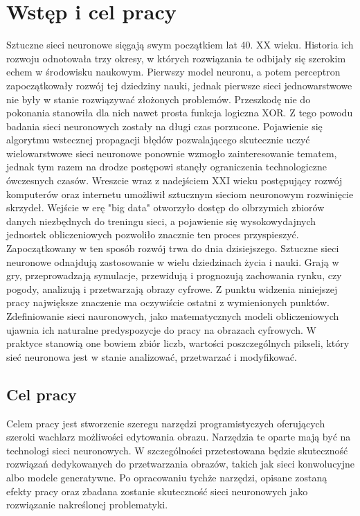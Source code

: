 \section{Wstęp i cel pracy}

  \tab Sztuczne sieci neuronowe sięgają swym początkiem lat 40. XX wieku.
  Historia ich rozwoju odnotowała trzy okresy, w których rozwiązania te
  odbijały się szerokim echem w środowisku naukowym.
  \newline
  \tab Pierwszy model neuronu, a potem perceptron zapoczątkowały
  rozwój tej dziedziny nauki, jednak pierwsze sieci jednowarstwowe nie były w
  stanie rozwiązywać złożonych problemów. Przeszkodę nie do pokonania stanowiła
  dla nich nawet prosta funkcja logiczna XOR. Z tego powodu badania sieci
  neuronowych zostały na długi czas porzucone.
  \newline
  \tab Pojawienie się algorytmu wstecznej propagacji błędów
  pozwalającego skutecznie uczyć wielowarstwowe sieci neuronowe ponownie
  wzmogło zainteresowanie tematem, jednak tym razem na drodze postępowi stanęły
  ograniczenia technologiczne ówczesnych czasów.
  \newline
  \tab Wreszcie wraz z nadejściem XXI wieku postępujący rozwój
  komputerów oraz internetu umożliwił sztucznym sieciom neuronowym rozwinięcie
  skrzydeł. Wejście w erę "big data" otworzyło dostęp do olbrzymich zbiorów
  danych niezbędnych do treningu sieci, a pojawienie się wysokowydajnych
  jednostek obliczeniowych pozwoliło znacznie ten proces przyspieszyć.
  \newline
  \tab Zapoczątkowany w ten sposób rozwój trwa do dnia dzisiejszego.
  Sztuczne sieci neuronowe odnajdują zastosowanie w wielu dziedzinach życia i
  nauki. Grają w gry, przeprowadzają symulacje, przewidują i prognozują
  zachowania rynku, czy pogody, analizują i przetwarzają obrazy cyfrowe.
  \newline 
  \tab Z punktu widzenia niniejszej pracy największe znaczenie ma
  oczywiście ostatni z wymienionych punktów. Zdefiniowanie sieci nauronowych,
  jako matematycznych modeli obliczeniowych ujawnia ich naturalne predyspozycje
  do pracy na obrazach cyfrowych. W praktyce stanowią one bowiem zbiór liczb,
  wartości poszczególnych pikseli, który sieć neuronowa jest w stanie
  analizować, przetwarzać i modyfikować.

  \subsection{Cel pracy}
    \tab Celem pracy jest stworzenie szeregu narzędzi programistyczych
    oferujących szeroki wachlarz możliwości edytowania obrazu. Narzędzia te
    oparte mają być na technologi sieci neuronowych. W szczególności
    przetestowana będzie skuteczność rozwiązań dedykowanych do przetwarzania
    obrazów, takich jak sieci konwolucyjne albo modele generatywne.
    \newline
    \tab Po opracowaniu tychże narzędzi, opisane zostaną efekty pracy oraz
    zbadana zostanie skuteczność sieci neuronowych jako rozwiązanie nakreślonej
    problematyki.

